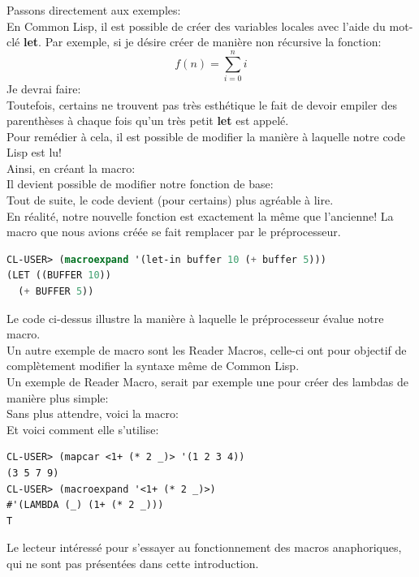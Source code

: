 \documentclass[a4paper, 12pt]{article}
\numberwithin{equation}{subsection}
\begin{document}
Passons directement aux exemples:\\

En Common Lisp, il est possible de créer des variables locales avec l'aide du mot-clé {\bf let}. Par exemple, si je désire créer de manière non récursive la fonction: \\

$$f(n) = \sum_{i=0}^{n}i$$
Je devrai faire: \\

Toutefois, certains ne trouvent pas très esthétique le fait de devoir empiler des parenthèses à chaque fois qu'un très petit {\bf let} est appelé. \\

Pour remédier à cela, il est possible de modifier la manière à laquelle notre code Lisp est lu! \\

Ainsi, en créant la macro: \\

Il devient possible de modifier notre fonction de base: \\

Tout de suite, le code devient (pour certains) plus agréable à lire.\\

En réalité, notre nouvelle fonction est exactement la même que l'ancienne! La macro que nous avions créée se fait remplacer par le préprocesseur.
\begin{lstlisting}[language=Lisp]
CL-USER> (macroexpand '(let-in buffer 10 (+ buffer 5)))
(LET ((BUFFER 10))
  (+ BUFFER 5))
\end{lstlisting}
Le code ci-dessus illustre la manière à laquelle le préprocesseur évalue notre macro.\\

Un autre exemple de macro sont les Reader Macros, celle-ci ont pour objectif de complètement modifier la syntaxe même de Common Lisp. \\

Un exemple de Reader Macro, serait par exemple une pour créer des lambdas de manière plus simple:\\

Sans plus attendre, voici la macro: \\

Et voici comment elle s'utilise: \\
\begin{lstlisting}
CL-USER> (mapcar <1+ (* 2 _)> '(1 2 3 4))
(3 5 7 9)
CL-USER> (macroexpand '<1+ (* 2 _)>)
#'(LAMBDA (_) (1+ (* 2 _)))
T
\end{lstlisting}
Le lecteur intéressé pour s'essayer au fonctionnement des macros anaphoriques, qui ne sont pas présentées dans cette introduction.\\
\end{document}
